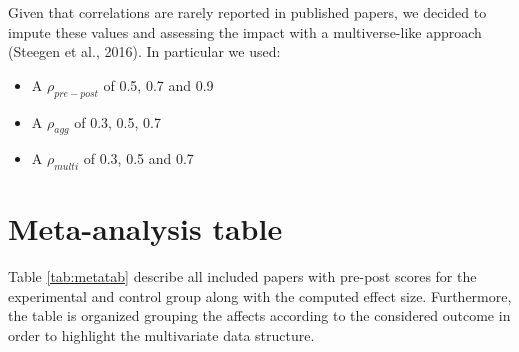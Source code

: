 \documentclass[
]{article}
\newenvironment{Shaded}{\begin{snugshade}}{\end{snugshade}}
\newcommand{\FunctionTok}[1]{\textcolor[rgb]{0.00,0.00,0.00}{#1}}
\newcommand{\NormalTok}[1]{#1}
\newcommand{\SpecialCharTok}[1]{\textcolor[rgb]{0.00,0.00,0.00}{#1}}
\newcommand{\StringTok}[1]{\textcolor[rgb]{0.31,0.60,0.02}{#1}}
\providecommand{\tightlist}{%
  \setlength{\itemsep}{0pt}\setlength{\parskip}{0pt}}
\begin{document}
Given that correlations are rarely reported in published papers, we decided to impute these values and assessing the impact with a multiverse-like approach (Steegen et al., 2016). In particular we used:

\begin{itemize}
\tightlist
\item
  A \(\rho_{pre-post}\) of 0.5, 0.7 and 0.9
\item
  A \(\rho_{agg}\) of 0.3, 0.5, 0.7
\item
  A \(\rho_{multi}\) of 0.3, 0.5 and 0.7
\end{itemize}

\hypertarget{meta-analysis-table}{%
\section{Meta-analysis table}\label{meta-analysis-table}}

Table \ref{tab:metatab} describe all included papers with pre-post scores for the experimental and control group along with the computed effect size. Furthermore, the table is organized grouping the affects according to the considered outcome in order to highlight the multivariate data structure.

\begin{Shaded}
\end{Shaded}

\providecommand{\docline}[3]{\noalign{\global\setlength{\arrayrulewidth}{#1}}\arrayrulecolor[HTML]{#2}\cline{#3}}

\setlength{\tabcolsep}{2pt}

\renewcommand*{\arraystretch}{1.5}
\end{document}
